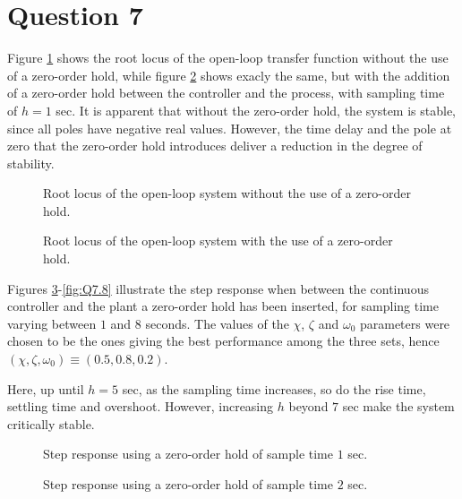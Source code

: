 \section{Question 7}

Figure \ref{fig:Q7.rloc_F_G} shows the root locus of the open-loop transfer
function without the use of a zero-order hold, while figure
\ref{fig:Q7.rloc_F_ZOH_G} shows exacly the same, but with the addition of a
zero-order hold between the controller and the process, with sampling time of
$h=1$ sec. It is apparent that without the zero-order hold, the system is stable,
since all poles have negative real values. However, the time delay and the pole
at zero that the zero-order hold introduces deliver a reduction in the degree of
stability.

\begin{figure}[H]\centering
	\centering
	\scalebox{1}{}
  \caption{Root locus of the open-loop system without the use of a zero-order hold.}
  \label{fig:Q7.rloc_F_G}
\end{figure}

\begin{figure}[H]\centering
	\centering
	\scalebox{1}{}
  \caption{Root locus of the open-loop system with the use of a zero-order hold.}
  \label{fig:Q7.rloc_F_ZOH_G}
\end{figure}

Figures \ref{fig:Q7.1}-\ref{fig:Q7.8} illustrate the step response when between
the continuous controller and the plant a zero-order hold has been inserted, for
sampling time varying between $1$ and $8$ seconds. The values of the $\chi$,
$\zeta$ and $\omega_0$ parameters were chosen to be the ones giving the best
performance among the three sets,
hence $(\chi, \zeta, \omega_0) \equiv (0.5, 0.8, 0.2)$.

Here, up until $h = 5$ sec, as the sampling time increases, so do the rise
time, settling time and overshoot. However, increasing $h$ beyond $7$ sec
make the system critically stable.

\begin{figure}[H]\centering
	\centering
	\scalebox{1}{}
  \caption{Step response using a zero-order hold of sample time $1$ sec.}
  \label{fig:Q7.1}
\end{figure}

\begin{figure}[H]\centering
	\centering
	\scalebox{1}{}
  \caption{Step response using a zero-order hold of sample time $2$ sec.}
  \label{fig:Q7.2}
\end{figure}

